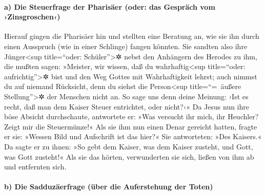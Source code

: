\hypertarget{a-die-steuerfrage-der-pharisuxe4er-oder-das-gespruxe4ch-vom-zinsgroschen}{%
\paragraph{a) Die Steuerfrage der Pharisäer (oder: das Gespräch vom
›Zinsgroschen‹)}\label{a-die-steuerfrage-der-pharisuxe4er-oder-das-gespruxe4ch-vom-zinsgroschen}}

 Hierauf gingen die Pharisäer hin und stellten eine
Beratung an, wie sie ihn durch einen Ausspruch (wie in einer Schlinge)
fangen könnten.  Sie sandten also ihre
Jünger\textless sup title=``oder: Schüler''\textgreater✲ nebst den
Anhängern des Herodes zu ihm, die mußten sagen: »Meister, wir wissen,
daß du wahrhaftig\textless sup title=``oder: aufrichtig''\textgreater✲
bist und den Weg Gottes mit Wahrhaftigkeit lehrst; auch nimmst du auf
niemand Rücksicht, denn du siehst die Person\textless sup
title=``=~äußere Stellung''\textgreater✲ der Menschen nicht an.
 So sage uns denn deine Meinung: ›Ist es recht, daß man
dem Kaiser Steuer entrichtet, oder nicht?‹«  Da Jesus nun
ihre böse Absicht durchschaute, antwortete er: »Was versucht ihr mich,
ihr Heuchler?  Zeigt mir die Steuermünze!« Als sie ihm
nun einen Denar gereicht hatten,  fragte er sie: »Wessen
Bild und Aufschrift ist das hier?«  Sie antworteten: »Des
Kaisers.« Da sagte er zu ihnen: »So gebt dem Kaiser, was dem Kaiser
zusteht, und Gott, was Gott zusteht!«  Als sie das
hörten, verwunderten sie sich, ließen von ihm ab und entfernten sich.

\hypertarget{b-die-sadduzuxe4erfrage-uxfcber-die-auferstehung-der-toten}{%
\paragraph{b) Die Sadduzäerfrage (über die Auferstehung der
Toten)}\label{b-die-sadduzuxe4erfrage-uxfcber-die-auferstehung-der-toten}}

